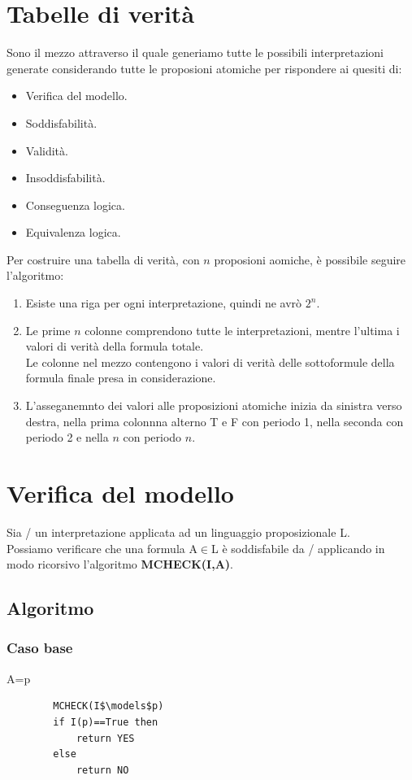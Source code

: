 \documentclass[../main.tex]{subfiles}
\begin{document}
    \section{Tabelle di verità}
    Sono il mezzo attraverso il quale generiamo tutte le possibili interpretazioni generate considerando tutte le proposioni atomiche per rispondere ai quesiti di:
    \begin{itemize}
        \item Verifica del modello.
        \item Soddisfabilità.
        \item Validità.
        \item Insoddisfabilità.
        \item Conseguenza logica.
        \item Equivalenza logica.
    \end{itemize}
    Per costruire una tabella di verità, con $n$ proposioni aomiche, è possibile seguire l'algoritmo:
    \begin{enumerate}
        \item Esiste una riga per ogni interpretazione, quindi ne avrò $2^n$.
        \item Le prime $n$ colonne comprendono tutte le interpretazioni, mentre l'ultima i valori di verità della formula totale.\\
            Le colonne nel mezzo contengono i valori di verità delle sottoformule della formula finale presa in considerazione.
        \item L'asseganemnto dei valori alle proposizioni atomiche inizia da sinistra verso destra, nella prima colonnna alterno T e F con periodo 1, nella seconda con periodo 2 e nella $n$ con periodo $n$.
    \end{enumerate}

    \section{Verifica del modello}
    Sia / un interpretazione applicata ad un linguaggio proposizionale L.\\
    Possiamo verificare che una formula A$\in$L è soddisfabile da / applicando in modo ricorsivo l'algoritmo \textbf{MCHECK(I,A)}.

    \subsection{Algoritmo}
    \subsubsection{Caso base}
    A=p
    \begin{lstlisting}
        MCHECK(I$\models$p)
        if I(p)==True then
            return YES
        else
            return NO
    \end{lstlisting}
\end{document}
